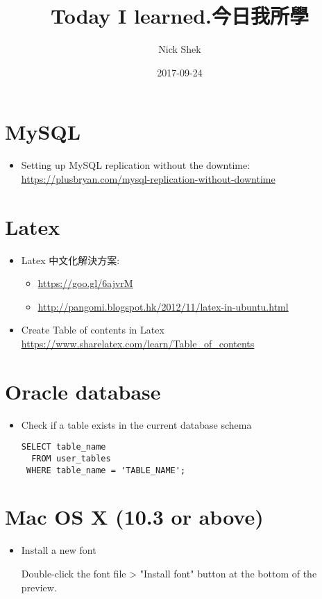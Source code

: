 \documentclass{article}
\title{Today I learned.今日我所學}
\author{Nick Shek}
\date{2017-09-24}
\begin{document}
\maketitle

\clearpage

\tableofcontents

\clearpage

\section{MySQL}

\begin{itemize}
\item Setting up MySQL replication without the downtime: \href{https://plusbryan.com/mysql-replication-without-downtime}{https://plusbryan.com/mysql-replication-without-downtime}
\end{itemize}

\section{Latex}

\begin{itemize}
\item Latex 中文化解決方案:
  \begin{itemize}
    \item \href{https://goo.gl/6ajvrM}{https://goo.gl/6ajvrM}
    \item \href{http://pangomi.blogspot.hk/2012/11/latex-in-ubuntu.html}{http://pangomi.blogspot.hk/2012/11/latex-in-ubuntu.html}
  \end{itemize}
\item Create Table of contents in Latex \href{https://www.sharelatex.com/learn/Table\_of\_contents}{https://www.sharelatex.com/learn/Table\_of\_contents}
\end{itemize}

\section{Oracle database}
\begin{itemize}
\item Check if a table exists in the current database schema
\begin{lstlisting}
SELECT table_name
  FROM user_tables
 WHERE table_name = 'TABLE_NAME';
\end{lstlisting}
\end{itemize}

\section{Mac OS X (10.3 or above)}
\begin{itemize}
\item Install a new font
  \begin{itemize}
    Double-click the font file > "Install font" button at the bottom of the preview.
  \end{itemize}
\end{itemize}
\end{document}
